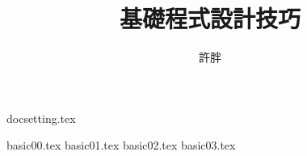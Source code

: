 \documentclass[12pt,a4paper,oneside]{article}
\begin{document}
\begin{CJK}{UTF8}{bkai}

{docsetting.tex}

\title{基礎程式設計技巧}
\author{許胖}

\begin{multicols}{2}
\tableofcontents
\end{multicols}

{basic00.tex}
{basic01.tex}
{basic02.tex}
{basic03.tex}

\printindex

\clearpage
\end{CJK}
\end{document}
